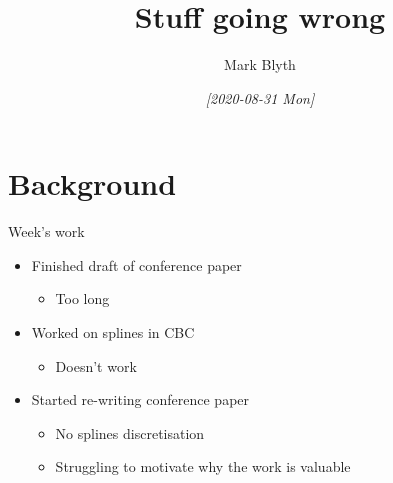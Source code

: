 \documentclass[presentation]{beamer}
\author{Mark Blyth}
\date{\textit{[2020-08-31 Mon]}}
\title{Stuff going wrong}
\begin{document}
\maketitle


\section{Background}
\label{sec:org254367c}
\begin{frame}[label={sec:org5417e82}]{Week's work}
\begin{itemize}
\item Finished draft of conference paper
\begin{itemize}
\item Too long
\end{itemize}
\end{itemize}
\vfill
\begin{itemize}
\item Worked on splines in CBC
\begin{itemize}
\item Doesn't work
\end{itemize}
\end{itemize}
\vfill
\begin{itemize}
\item Started re-writing conference paper
\begin{itemize}
\item No splines discretisation
\item Struggling to motivate why the work is valuable
\end{itemize}
\end{itemize}
\end{frame}
\end{document}
